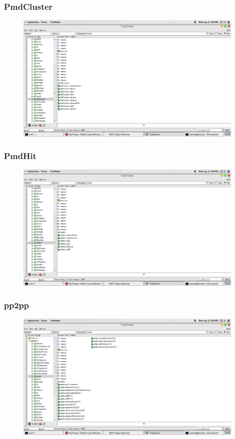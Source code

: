 \documentclass[10pt]{beamer}
\begin{document}
\label{PmdCluster}
\begin{frame}
  \frametitle{PmdCluster}
  \begin{figure}[hbtp]
    \centering
    \includegraphics[width=\textwidth]{PmdCluster.png}
  \end{figure}
\end{frame}
\label{PmdHit}
\begin{frame}
  \frametitle{PmdHit}
  \begin{figure}[hbtp]
    \centering
    \includegraphics[width=\textwidth]{PmdHit.png}
  \end{figure}
\end{frame}
\label{pp2pp}
\begin{frame}
  \frametitle{pp2pp}
  \begin{figure}[hbtp]
    \centering
    \includegraphics[width=\textwidth]{pp2pp.png}
  \end{figure}
\end{frame}
\end{document}
